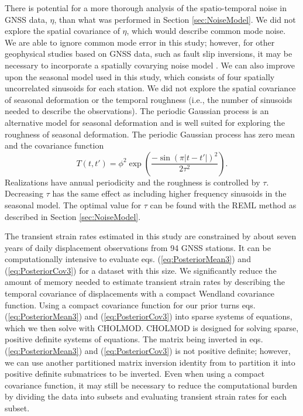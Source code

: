\documentclass[extra,mreferee]{gji}
\begin{document}
There is potential for a more thorough analysis of the spatio-temporal noise in GNSS data, $\eta$, than what was performed in Section \ref{sec:NoiseModel}. We did not explore the spatial covariance of $\eta$, which would describe common mode noise. We are able to ignore common mode error in this study; however, for other geophysical studies based on GNSS data, such as fault slip inversions, it may be necessary to incorporate a spatially covarying noise model \citep[e.g.,][]{Miyazaki2003}. We can also improve upon the seasonal model used in this study, which consists of four spatially uncorrelated sinusoids for each station. We did not explore the spatial covariance of seasonal deformation or the temporal roughness (i.e., the number of sinusoids needed to describe the observations). The periodic Gaussian process \citep{Mackay1998} is an alternative model for seasonal deformation and is well suited for exploring the roughness of seasonal deformation.  The periodic Gaussian process has zero mean and the covariance function
\begin{equation}\label{eq:Periodic}
T(t,t') = \phi^2 \exp\left(\frac{-\sin(\pi|t - t'|)^2}{2\tau^2}\right).
\end{equation}
Realizations have annual periodicity and the roughness is controlled by $\tau$. Decreasing $\tau$ has the same effect as including higher frequency sinusoids in the seasonal model. The optimal value for $\tau$ can be found with the REML method as described in Section \ref{sec:NoiseModel}. 

The transient strain rates estimated in this study are constrained by about seven years of daily displacement observations from 94 GNSS stations. It can be computationally intensive to evaluate eqs. (\ref{eq:PosteriorMean3}) and (\ref{eq:PosteriorCov3}) for a dataset with this size. We significantly reduce the amount of memory needed to estimate transient strain rates by describing the temporal covariance of displacements with a compact Wendland covariance function. Using a compact covariance function for our prior turns eqs. (\ref{eq:PosteriorMean3}) and (\ref{eq:PosteriorCov3}) into sparse systems of equations, which we then solve with CHOLMOD. CHOLMOD is designed for solving sparse, positive definite systems of equations. The matrix being inverted in eqs. (\ref{eq:PosteriorMean3}) and (\ref{eq:PosteriorCov3}) is not positive definite; however, we can use another partitioned matrix inversion identity from \citet{Press2007} to partition it into positive definite submatrices to be inverted. Even when using a compact covariance function, it may still be necessary to reduce the computational burden by dividing the data into subsets and evaluating transient strain rates for each subset.   
\end{document}
